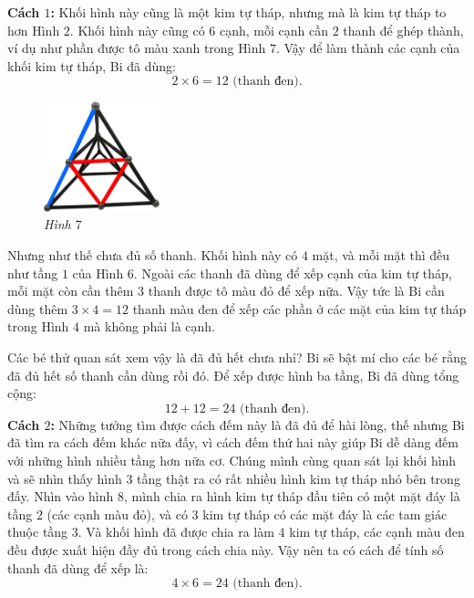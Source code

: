 	\vskip 0.1cm
	\textbf{Cách $1$:} Khối hình này cũng là một kim tự tháp, nhưng mà là kim tự tháp to hơn Hình $2$. Khối hình này cũng có $6$ cạnh, mỗi cạnh cần $2$  thanh để ghép thành, ví dụ như phần được tô màu xanh trong Hình $7$. Vậy để làm thành các cạnh của khối kim tự tháp, Bi đã dùng:
	$$ 2\times 6 = 12 \text{ (thanh đen)}.$$
	\begin{multicols}{2}
		\begin{figure}[H]
			\centering
			\vspace*{5pt}
			\captionsetup{labelformat= empty, justification=centering} \includegraphics[width=0.3\textwidth]{7}
			\caption{\small\textit{Hình $7$}}
			\vspace*{-10pt}
		\end{figure}
		Nhưng như thế chưa đủ số thanh. Khối hình này có $4$ mặt, và mỗi mặt thì đều như tầng $1$ của Hình $6$. Ngoài các thanh đã dùng để xếp cạnh của kim tự tháp, mỗi mặt còn cần thêm $3$ thanh được tô màu đỏ để xếp nữa. Vậy tức là Bi cần dùng thêm $3 \times 4 = 12$ thanh màu đen để xếp các phần ở các mặt của kim tự tháp trong Hình $4$ mà không phải là cạnh.
	\end{multicols}
	\vskip 0.1cm
	Các bé thử quan sát xem vậy là đã đủ hết chưa nhỉ? Bi sẽ bật mí cho các bé rằng đã đủ hết số  thanh cần dùng rồi đó. Để xếp được hình ba tầng, Bi đã dùng tổng cộng:
	$$ 12 + 12 = 24 \text{ (thanh đen)}.$$
	\textbf{Cách $2$:} Những tưởng tìm được cách đếm này là đã đủ để hài lòng, thế nhưng Bi đã tìm ra cách đếm khác nữa đấy, vì cách đếm thứ hai này giúp Bi dễ dàng đếm với những hình nhiều tầng hơn nữa cơ.
	\vskip 0.1cm
	Chúng mình cùng quan sát lại khối hình và sẽ nhìn thấy hình $3$ tầng thật ra có rất nhiều hình kim tự tháp nhỏ bên trong đấy. Nhìn vào hình $8$, mình chia ra hình kim tự tháp đầu tiên có một mặt đáy là tầng $2$ (các cạnh màu đỏ), và có $3$ kim tự tháp có các mặt đáy là các tam giác thuộc tầng $3$. Và khối hình đã được chia ra làm $4$ kim tự tháp, các cạnh màu đen đều được xuất hiện đầy đủ trong cách chia này. Vậy nên ta có cách để tính số thanh đã dùng để xếp là: 
	$$4 \times 6 = 24 \text{ (thanh đen)}.$$	
